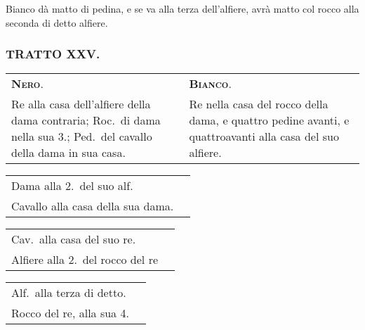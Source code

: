 \documentclass[11pt,a6paper]{article}
\begin{document}
Bianco dà matto di pedina, e se va alla terza dell'alfiere, avrà matto col rocco alla seconda di detto alfiere.

\subsubsection{TRATTO XXV.}
{\small
 \noindent\begin{tabular}{@{}p{3.84cm}p{3.84cm}}
 {\bfseries\scshape Nero}.& {\bfseries\scshape Bianco}.\\
Re alla casa dell'alfiere della dama contraria; Roc.\ di dama nella sua 3.; Ped.\ del cavallo della dama in sua casa. & Re nella casa del rocco della dama, e quattro pedine avanti, e quattroavanti alla casa del suo alfiere. \\
\end{tabular}

\noindent\begin{tabular}{@{}p{3.84cm}p{3.84cm}}
Dama alla 2.\ del suo alf.\\
Cavallo alla casa della sua dama.\\
\end{tabular}

\noindent\begin{tabular}{@{}p{3.84cm}p{3.84cm}}
Cav.\ alla casa del suo re.\\
Alfiere alla 2.\ del rocco del re \\
\end{tabular}

\noindent\begin{tabular}{@{}p{3.84cm}p{3.84cm}}
Alf.\ alla terza di detto.\\
Rocco del re, alla sua 4.
\end{tabular}
}
\end{document}

